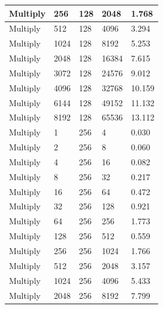 \documentclass{article}
\begin{document}
\begin{longtable}{|l|l|l|l|l|}
Multiply           & 256  & 128         & 2048              & 1.768             \\ \hline
Multiply           & 512  & 128         & 4096              & 3.294             \\ \hline
Multiply           & 1024 & 128         & 8192              & 5.253             \\ \hline
Multiply           & 2048 & 128         & 16384             & 7.615             \\ \hline
Multiply           & 3072 & 128         & 24576             & 9.012             \\ \hline
Multiply           & 4096 & 128         & 32768             & 10.159            \\ \hline
Multiply           & 6144 & 128         & 49152             & 11.132            \\ \hline
Multiply           & 8192 & 128         & 65536             & 13.112            \\ \hline
Multiply           & 1    & 256         & 4                 & 0.030             \\ \hline
Multiply           & 2    & 256         & 8                 & 0.060             \\ \hline
Multiply           & 4    & 256         & 16                & 0.082             \\ \hline
Multiply           & 8    & 256         & 32                & 0.217             \\ \hline
Multiply           & 16   & 256         & 64                & 0.472             \\ \hline
Multiply           & 32   & 256         & 128               & 0.921             \\ \hline
Multiply           & 64   & 256         & 256               & 1.773             \\ \hline
Multiply           & 128  & 256         & 512               & 0.559             \\ \hline
Multiply           & 256  & 256         & 1024              & 1.766             \\ \hline
Multiply           & 512  & 256         & 2048              & 3.157             \\ \hline
Multiply           & 1024 & 256         & 4096              & 5.433             \\ \hline
Multiply           & 2048 & 256         & 8192              & 7.799             \\ \hline

\end{longtable}
\end{document}
